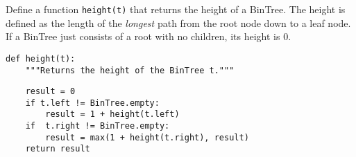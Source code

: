 \question Define a function {\tt height(t)} that returns the height of a
BinTree.  The height is defined as the length of the {\it longest} path from
the root node down to a leaf node. If a BinTree just consists of a root with
no children, its height is 0.

\begin{lstlisting}
def height(t):
    """Returns the height of the BinTree t."""
\end{lstlisting}
\begin{solution}[1.75in]
\begin{lstlisting}
    result = 0
    if t.left != BinTree.empty:
        result = 1 + height(t.left)
    if  t.right != BinTree.empty:
        result = max(1 + height(t.right), result)
    return result
\end{lstlisting}
\end{solution}
